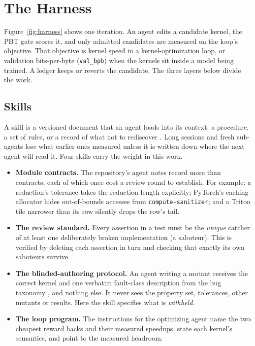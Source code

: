 \section{The Harness}
\label{sec:harness}



Figure~\ref{fig:harness} shows one iteration. An agent edits a candidate kernel, the
PBT gate scores it, and only admitted candidates are measured on the loop's objective.
That objective is kernel speed in a kernel-optimization loop, or validation
bits-per-byte (\texttt{val\_bpb}) when the kernels sit inside a model being trained.
A ledger keeps or reverts the candidate. The three layers below divide the work.

\subsection{Skills}
\label{sec:skills}

A skill is a versioned document that an agent loads into its context: a procedure, a
set of rules, or a record of what not to rediscover \citep{anthropic2025skills}. Long
sessions and fresh sub-agents lose what earlier ones measured unless it is written
down where the next agent will read it. Four skills carry the weight in this work.
\begin{itemize}
  \item \textbf{Module contracts.} The repository's agent notes record more than
    \contractCount{} contracts, each of which once cost a review round to establish. For
    example: a reduction's tolerance takes the reduction length explicitly; PyTorch's
    caching allocator hides out-of-bounds accesses from \texttt{compute-sanitizer}; and a
    Triton tile narrower than its row silently drops the row's tail.
  \item \textbf{The review standard.} Every assertion in a test must be the
    \emph{unique} catcher of at least one deliberately broken implementation (a
    saboteur). This is verified by deleting each assertion in turn and checking that
    exactly its own saboteurs survive.
  \item \textbf{The blinded-authoring protocol.} An agent writing a mutant receives the
    correct kernel and one verbatim fault-class description from the bug taxonomy
    \citep{rathnasuriya2026tile}, and nothing else. It never sees the property set,
    tolerances, other mutants or results. Here the skill specifies what is
    \emph{withheld}.
  \item \textbf{The loop program.} The instructions for the optimizing agent name the two
    cheapest reward hacks and their measured speedups, state each kernel's semantics, and
    point to the measured headroom.
\end{itemize}

